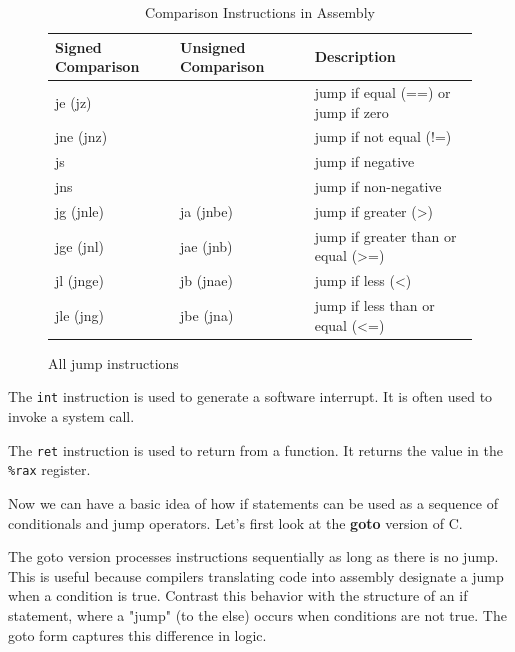 \begin{definition}[Jump]
    \begin{figure}[H]
      \centering 
      \begin{table}[H]
        \centering
        \begin{tabular}{|l|l|l|}
        \hline
        \textbf{Signed Comparison} & \textbf{Unsigned Comparison} & \textbf{Description} \\ \hline
        je (jz) & & jump if equal (==) or jump if zero \\ \hline
        jne (jnz) & & jump if not equal (!=) \\ \hline
        js & & jump if negative \\ \hline
        jns & & jump if non-negative \\ \hline
        jg (jnle) & ja (jnbe) & jump if greater (>) \\ \hline
        jge (jnl) & jae (jnb) & jump if greater than or equal (>=) \\ \hline
        jl (jnge) & jb (jnae) & jump if less (<) \\ \hline
        jle (jng) & jbe (jna) & jump if less than or equal (<=) \\ \hline
        \end{tabular}
        \caption{Comparison Instructions in Assembly}
        \label{table:comparison_instructions}
      \end{table}
      \caption{All jump instructions} 
      \label{fig:jump_instructions_all}
    \end{figure}
  \end{definition}

  \begin{definition}[int]
    \label{def:int-2}
    The \texttt{int} instruction is used to generate a software interrupt. It is often used to invoke a system call.
  \end{definition}

  \begin{definition}[ret]
    \label{def:ret-2}
    The \texttt{ret} instruction is used to return from a function. It returns the value in the \texttt{\%rax} register. 
  \end{definition}

  Now we can have a basic idea of how if statements can be used as a sequence of conditionals and jump operators. Let's first look at the \textbf{goto} version of C. 

  \begin{definition}
    \label{def:goto-syntax}
    The goto version processes instructions sequentially as long as there is no jump. This is useful because compilers translating code into assembly designate a jump when a condition is true. Contrast this behavior with the structure of an if statement, where a "jump" (to the else) occurs when conditions are not true. The goto form captures this difference in logic.
  \end{definition}

